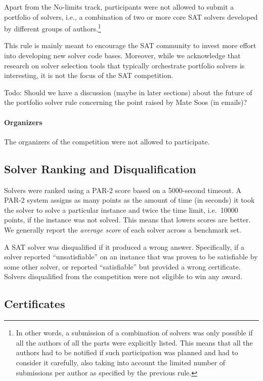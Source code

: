 \documentclass{elsarticle}
\newcommand{\todo}[1]{{\color{purple}Todo: #1}}
\begin{document}
Apart from the No-limits track, participants were not allowed to submit a portfolio of solvers,
i.e., a combination of two or more core SAT solvers developed by different groups of authors.\footnote{
In other words, a submission of a combination of solvers was only possible if all the authors of all the parts
were explicitly listed. This means that all the authors had to be notified if such participation
was planned and had to consider it carefully, also taking into account the limited number of submissions per author
as specified by the previous rule.}

This rule is mainly meant to encourage the SAT community to invest more effort into developing new solver code bases.
Moreover, while we acknowledge that research on solver selection tools that typically orchestrate portfolio solvers 
is interesting, it is not the focus of the SAT competition.

\todo{Should we have a discussion (maybe in later sections)
about the future of the portfolio solver rule
concerning the point raised by Mate Soos (in emails)?}

\paragraph{Organizers}
The organizers of the competition were not allowed to participate.

\subsection{Solver Ranking and Disqualification}

Solvers were ranked using a PAR-2 score based on a \num{5000}-second timeout.
A PAR-2 system assigns as many points as the amount of time (in seconds) it took the solver
to solve a particular instance and twice the time limit, i.e.~\num{10000} points,
if the instance was not solved. This means that lowers scores are better.
We generally report the \emph{average score} of each solver across a benchmark set.

A SAT solver was disqualified if it produced a wrong answer. 
Specifically, if a solver reported ``unsatisfiable'' on an instance that 
was proven to be satisfiable by some other solver, or reported ``satisfiable'' 
but provided a wrong certificate. Solvers disqualified from the competition were
not eligible to win any award. 

\subsection{Certificates}
\end{document}
